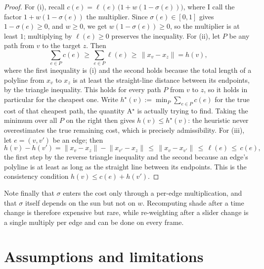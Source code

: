 \documentclass[11pt,a4paper]{article}
\theoremstyle{plain}
\theoremstyle{definition}
\theoremstyle{remark}
\begin{document}
\begin{proof}
For (i), recall $c(e) = \ell(e)\,\big(1 + w(1-\sigma(e))\big)$, where I call the factor $1 + w(1-\sigma(e))$ the multiplier. Since $\sigma(e) \in [0,1]$ gives $1 - \sigma(e) \ge 0$, and $w \ge 0$, we get $w(1-\sigma(e)) \ge 0$, so the multiplier is at least $1$; multiplying by $\ell(e) \ge 0$ preserves the inequality. For (ii), let $P$ be any path from $v$ to the target $z$. Then
$$\sum_{e \in P} c(e)  \, \ge \,  \sum_{e \in P} \ell(e)  \, \ge \,  \lVert x_v - x_z\rVert = h(v),$$
where the first inequality is (i) and the second holds because the total length of a polyline from $x_v$ to $x_z$ is at least the straight-line distance between its endpoints, by the triangle inequality. This holds for every path $P$ from $v$ to $z$, so it holds in particular for the cheapest one. Write $h^\star(v) := \min_P \sum_{e \in P} c(e)$ for the true cost of that cheapest path, the quantity A$^\star$ is actually trying to find. Taking the minimum over all $P$ on the right then gives $h(v) \le h^\star(v)$: the heuristic never overestimates the true remaining cost, which is precisely admissibility. For (iii), let $e = (v, v')$ be an edge; then
$$h(v) - h(v') = \lVert x_v - x_z \rVert - \lVert x_{v'} - x_z \rVert  \, \le \,  \lVert x_v - x_{v'} \rVert  \, \le \,  \ell(e)  \, \le \,  c(e),$$
the first step by the reverse triangle inequality and the second because an edge's polyline is at least as long as the straight line between its endpoints. This is the consistency condition $h(v) \le c(e) + h(v')$.
\end{proof}

Note finally that $\sigma$ enters the cost only through a per-edge multiplication, and that $\sigma$ itself depends on the sun but not on $w$. Recomputing shade after a time change is therefore expensive but rare, while re-weighting after a slider change is a single multiply per edge and can be done on every frame.

\section{Assumptions and limitations}
\label{sec:limits}
\end{document}
